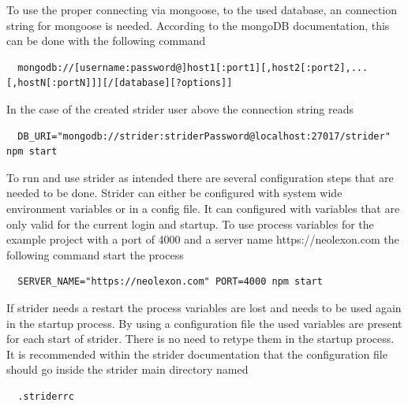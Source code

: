 To use the proper connecting via mongoose, to the used database, an connection string for mongoose is needed. According to the mongoDB
documentation, this can be done with the following command
\begin{lstlisting}
  mongodb://[username:password@]host1[:port1][,host2[:port2],...[,hostN[:portN]]][/[database][?options]]
\end{lstlisting}
In the case of the created strider user above the connection string reads
\begin{lstlisting}
  DB_URI="mongodb://strider:striderPassword@localhost:27017/strider" npm start
\end{lstlisting}

To run and use strider as intended there are several configuration steps that are needed to be done. Strider can either be configured
with system wide environment variables or in a config file. It can configured with variables that are only valid for the current login and
startup. To use process variables for the example project with a port of 4000 and a server name https://neolexon.com the following
command start the process

\begin{lstlisting}
  SERVER_NAME="https://neolexon.com" PORT=4000 npm start
\end{lstlisting}

If strider needs a restart the process variables are lost and needs to be used again in the startup process. By using a configuration file
the used variables are present for each start of strider. There is no need to retype them in the startup process. It is recommended within
the strider documentation that the configuration file should go inside the strider main directory named

\begin{lstlisting}
  .striderrc
\end{lstlisting}

